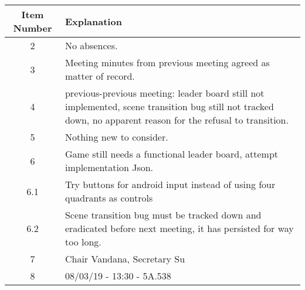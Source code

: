 \documentclass{article}
\begin{document}
\begin{table}[H]
	\centering
	\begin{tabular}{| c | p{9cm} |}
		\hline
		Item Number & Explanation \\ \hline
		2 & No absences.\\ \hline
		3 & Meeting minutes from previous meeting agreed as matter of record. \\ \hline
		4 & previous-previous meeting: leader board still not implemented, scene transition bug still not tracked down, no apparent reason for the refusal to transition. \\ \hline
		5 & Nothing new to consider. \\ \hline
		6 & Game still needs a functional leader board, attempt implementation Json. \\ \hline
		6.1 & Try buttons for android input instead of using four quadrants as controls \\ \hline
		6.2 & Scene transition bug must be tracked down and eradicated before next meeting, it has persisted for way too long. \\ \hline
		7 & Chair Vandana, Secretary Su\\ \hline
		8 & 08/03/19 - 13:30 - 5A.538   \\ \hline

		
	\end{tabular}
\end{table}
\end{document}
